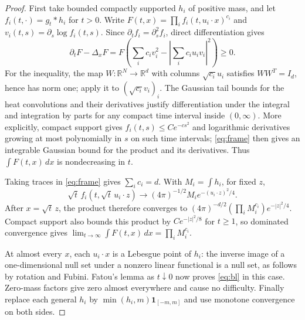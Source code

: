 \documentclass[11pt]{article}
\numberwithin{equation}{section}
\theoremstyle{definition}\newtheorem{definition}[theorem]{Definition}
\theoremstyle{remark}\newtheorem{remark}[theorem]{Remark}
\newcommand{\R}{\mathbb R}\newcommand{\E}{\mathbb E}\newcommand{\PP}{\mathbb P}
\newcommand{\1}{\mathbf 1}\newcommand{\diag}{\operatorname{diag}}
\begin{document}
\begin{proof}
First take bounded compactly supported $h_i$ of positive mass, and let
$f_i(t,\cdot)=g_t*h_i$ for $t>0$. Write
$F(t,x)=\prod_i f_i(t,u_i\cdot x)^{c_i}$ and
$v_i(t,s)=\partial_s\log f_i(t,s)$. Since $\partial_t f_i=\partial_s^2 f_i$, direct differentiation gives
\[
 \partial_t F-\Delta_x F
 =F\left(\sum_i c_i v_i^2-
 \left|\sum_i c_i u_i v_i\right|^2\right)\ge0.
\]
For the inequality, the map $W:\R^N\to\R^d$ with columns $\sqrt{c_i}u_i$ satisfies $WW^T=I_d$, hence has norm one; apply it to $(\sqrt{c_i}v_i)_i$. The Gaussian tail bounds for the heat convolutions and their derivatives justify differentiation under the integral and integration by parts for any compact time interval inside $(0,\infty)$. More explicitly, compact support gives $f_i(t,s)\le C e^{-c s^2}$ and logarithmic derivatives growing at most polynomially in $s$ on such time intervals; \eqref{eq:frame} then gives an integrable Gaussian bound for the product and its derivatives. Thus $\int F(t,x)\,dx$ is nondecreasing in $t$.

Taking traces in \eqref{eq:frame} gives $\sum_i c_i=d$. With $M_i=\int h_i$, for fixed $z$,
\[
 \sqrt t\, f_i(t,\sqrt t\,u_i\cdot z)
 \longrightarrow (4\pi)^{-1/2}M_i e^{-(u_i\cdot z)^2/4}.
\]
After $x=\sqrt t\,z$, the product therefore converges to
$(4\pi)^{-d/2}(\prod_i M_i^{c_i})e^{-|z|^2/4}$.
Compact support also bounds this product by $C e^{-|z|^2/8}$ for $t\ge1$, so dominated convergence gives
$\lim_{t\to\infty}\int F(t,x)\,dx=\prod_i M_i^{c_i}$.

At almost every $x$, each $u_i\cdot x$ is a Lebesgue point of $h_i$: the inverse image of a one-dimensional null set under a nonzero linear functional is a null set, as follows by rotation and Fubini. Fatou's lemma as $t\downarrow0$ now proves \eqref{eq:bl} in this case. Zero-mass factors give zero almost everywhere and cause no difficulty. Finally replace each general $h_i$ by $\min(h_i,m)\1_{[-m,m]}$ and use monotone convergence on both sides.
\end{proof}
\end{document}
